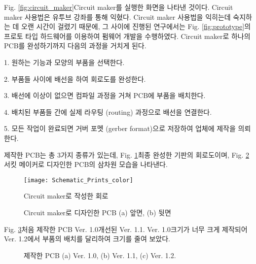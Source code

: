 Fig. \ref{fig:circuit_maker}\는 Circuit maker를 실행한 화면을 나타낸 것이다. Circuit maker 사용법은 유투브 강좌를 통해 익혔다. Circuit maker 사용법을 익히는데 숙지하는 데 오랜 시간이 걸렸기 때문에, 그 사이에 진행된 연구에서는 Fig. \ref{fig:prototype}의 프로토 타입 하드웨어를 이용하여 펌웨어 개발을 수행하였다. Circuit maker로 하나의 PCB를 완성하기까지 다음의 과정을 거치게 된다.

1. 원하는 기능과 모양의 부품을 선택한다.

2. 부품들 사이에 배선을 하여 회로도를 완성한다.

3. 배선에 이상이 없으면 컴파일 과정을 거쳐 PCB에 부품을 배치한다. 

4. 배치된 부품들 간에 실제 라우팅 (routing) 과정으로 배선을 연결한다. 

5. 모든 작업이 완료되면 거버 포멧 (gerber format)으로 저장하여 업체에 제작을 의뢰한다.

제작한 PCB는 총 3가지 종류가 있는데, Fig. \ref{fig:Schematic_Prints}\는 최종 완성한 기판의 회로도이며, Fig. \ref{fig:pcb}\은 서킷 메이커로 디자인한 PCB의 삼차원 모습을 나타낸다.

\begin{figure}[h]
	\begin{center}
		\texttt{[image: Schematic\_Prints\_color]}
		\caption{Circuit maker로 작성한 회로}
		\label{fig:Schematic_Prints}
	\end{center}
\end{figure}

\begin{figure}[h]
	\begin{center}
	\end{center}
		\caption{Circuit maker로 디자인한 PCB (a) 앞면, (b) 뒷면}
	\label{fig:pcb}
\end{figure}

\clearpage

Fig. \ref{fig:pcbcircuit}\은 처음 제작한 PCB Ver. 1.0\과 개선된 Ver. 1.1. Ver. 1.0\은 크기가 너무 크게 제작되어 Ver. 1.2에서 부품의 배치를 달리하여 크기를 줄여 보았다.

\begin{figure}[h]
	\begin{center}
		\caption{제작한 PCB (a) Ver. 1.0, (b) Ver. 1.1, (c) Ver. 1.2.}
		\label{fig:pcbcircuit}
	\end{center}
\end{figure}

